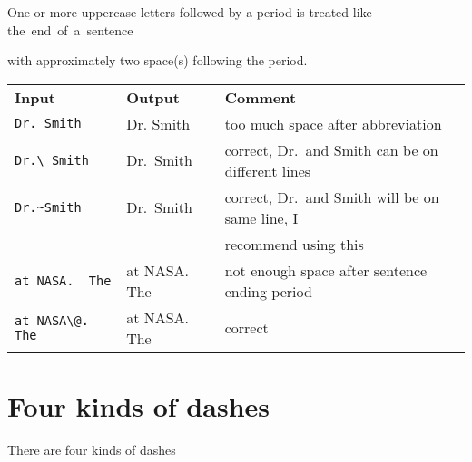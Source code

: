 One or more
\hbox{}%
\hbox{\small uppercase}
letters followed by a period is treated like
\hbox{}%
\hbox{\small the end of a sentence}\break

\vspace*{-12pt}
\noindent with approximately
\hbox{\small {}}%
\hbox{\small two}
space(s) following the period.%

\begin{tabular}{@{}lll@{}}
  \bfseries Input& \bfseries Output& \bfseries Comment\\
  \noalign{\vspace{2pt}}
  \verb+Dr. Smith+& Dr. Smith& too much space after abbreviation\\
  \verb+Dr.\ Smith+& Dr.\ Smith& correct, Dr.\ and Smith can be on different lines\\
  \verb+Dr.~Smith+& Dr.~Smith& correct, Dr.\ and Smith will be on same line, I\\
  & & recommend using this\\
  \noalign{\vspace{2pt}}
  \verb+at NASA.  The+& at NASA.  The& not enough space after sentence ending period\\
  \verb+at NASA\@.  The+& at NASA\@.  The& correct\\
\end{tabular}
\index{\verb*+\ +}


\section{Four kinds of dashes}

There are four kinds of dashes

